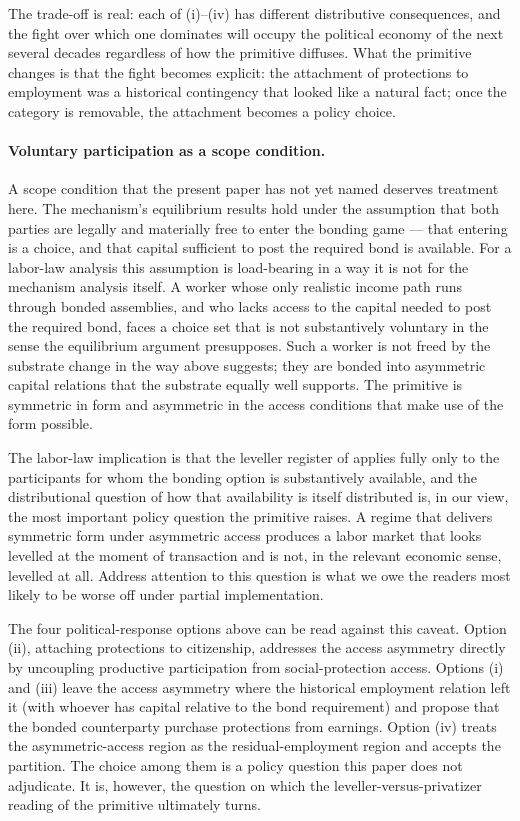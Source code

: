 \documentclass[11pt,a4paper]{article}
\theoremstyle{remark}
\begin{document}
The trade-off is real: each of (i)--(iv) has different
distributive consequences, and the fight over which one
dominates will occupy the political economy of the next several
decades regardless of how the primitive diffuses. What the
primitive changes is that the fight becomes explicit: the
attachment of protections to employment was a historical
contingency that looked like a natural fact; once the category
is removable, the attachment becomes a policy choice.

\paragraph{Voluntary participation as a scope condition.}
A scope condition that the present paper has not yet named
deserves treatment here. The mechanism's equilibrium results
hold under the assumption that both parties are legally and
materially free to enter the bonding game --- that entering
is a choice, and that capital sufficient to post the required
bond is available. For a labor-law analysis this assumption is
load-bearing in a way it is not for the mechanism analysis
itself. A worker whose only realistic income path runs through
bonded assemblies, and who lacks access to the capital needed to
post the required bond, faces a choice set that is not
substantively voluntary in the sense the equilibrium argument
presupposes. Such a worker is not freed by the substrate change
in the way  above suggests; they are bonded
into asymmetric capital relations that the substrate equally well
supports. The primitive is symmetric in form and asymmetric in
the access conditions that make use of the form possible.

The labor-law implication is that the leveller register of
 applies fully only to the participants for
whom the bonding option is substantively available, and the
distributional question of how that availability is itself
distributed is, in our view, the most important policy question
the primitive raises. A regime that delivers symmetric form
under asymmetric access produces a labor market that looks
levelled at the moment of transaction and is not, in the
relevant economic sense, levelled at all. Address attention to
this question is what we owe the readers most likely to be
worse off under partial implementation.

The four political-response options above can be read against
this caveat. Option (ii), attaching protections to citizenship,
addresses the access asymmetry directly by uncoupling
productive participation from social-protection access. Options
(i) and (iii) leave the access asymmetry where the historical
employment relation left it (with whoever has capital relative
to the bond requirement) and propose that the bonded
counterparty purchase protections from earnings. Option (iv)
treats the asymmetric-access region as the residual-employment
region and accepts the partition. The choice among them is a
policy question this paper does not adjudicate. It is, however,
the question on which the leveller-versus-privatizer reading of
the primitive ultimately turns.
\end{document}
